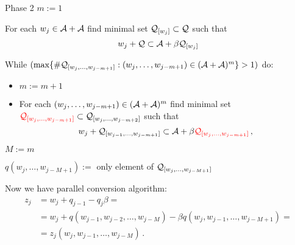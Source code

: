     {Phase 2}
      $m:=1$
      
      For each $w_j \in \mathcal{A}+\mathcal{A}$ find minimal set $\mathcal{Q}_{[w_j]} \subset \mathcal{Q}$ such that
      $$
      w_j + \mathcal{Q} \subset \mathcal{A} + \beta \mathcal{Q}_{[w_j]}
      $$
    
      While $(\max\{\#\mathcal{Q}_{[w_j,\dots, w_{j-m+1}]}:(w_j,\dots, w_{j-m+1}) \in (\mathcal{A}+\mathcal{A})^m \} > 1)$ do:
      \begin{itemize}
          
          \item $m:= m +1$
          
          \item For each $(w_j,\dots, w_{j-m+1}) \in (\mathcal{A}+\mathcal{A})^{m}$ find minimal set $\textcolor{red}{\mathcal{Q}_{[w_j,\dots, w_{j-m+1}]}} \subset \mathcal{Q}_{[w_j,\dots, w_{j-m+2}]}$ such that
          $$
          w_j + \mathcal{Q}_{[w_{j-1},\dots, w_{j-m+1}]} \subset \mathcal{A} + \beta \textcolor{red}{\mathcal{Q}_{[w_j,\dots, w_{j-m+1}]}}\,,
          $$
      \end{itemize}
      
      $M:= m$ 
      
      
      $q(w_j,\dots, w_{j-M+1}):=$ only element of $\mathcal{Q}_{[w_j,\dots, w_{j-M+1}]}$
    



        Now we have parallel conversion algorithm:
    \begin{align*}
    z_j&=w_j + q_{j-1} - q_j \beta = \\
       &=w_j + q(w_{j-1},w_{j-2},\dots, w_{j-M}) - \beta q(w_j,w_{j-1},\dots, w_{j-M+1}) = \\
       &= z_j(w_{j},w_{j-1},\dots, w_{j-M})\,.
    \end{align*}




